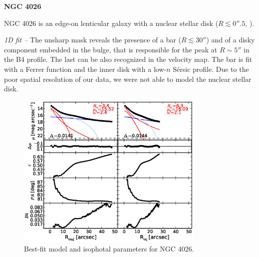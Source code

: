 \documentclass[preprint2]{emulateapj}
\newcommand{\fitfigurewidth}{0.8\textwidth}
\begin{document}
  \clearpage\newpage\noindent
  {\bf NGC 4026 \\}

  NGC 4026 is an edge-on lenticular galaxy with a nuclear stellar disk ($R \lesssim 0''.5$, \citealt{ledo2010}).


  \emph{1D fit -- }
  The unsharp mask reveals the presence of a bar ($R \lesssim 30''$) and of a disky component 
  embedded in the bulge, that is responsible for the peak at $R \sim 5''$ in the B4 profile.
  The last can be also recognized in the velocity map.
  The bar is fit with a Ferrer function and the inner disk with a low-$n$ S\'ersic profile.
  Due to the poor spatial resolution of our data, we were not able to model the nuclear stellar disk.

  \begin{figure}[h]
  \begin{center}
  \includegraphics[width=\fitfigurewidth]{images/n4026_1Dfit.eps}
  \caption{Best-fit model and isophotal parameters for NGC 4026.}
  \end{center}
  \end{figure}
\end{document}
